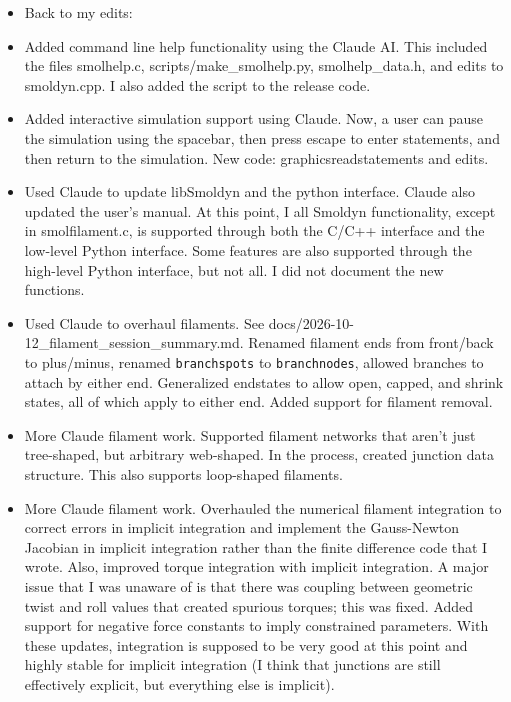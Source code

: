 \documentclass {scrbook}
\newcommand {\ttt} {\texttt}
\begin{document}
\begin{itemize}
\item Back to my edits:
\item Added command line help functionality using the Claude AI. This included the files smolhelp.c, scripts/make\_smolhelp.py, smolhelp\_data.h, and edits to smoldyn.cpp. I also added the script to the release code.
\item Added interactive simulation support using Claude. Now, a user can pause the simulation using the spacebar, then press escape to enter statements, and then return to the simulation. New code: graphicsreadstatements and edits.
\item Used Claude to update libSmoldyn and the python interface. Claude also updated the user's manual. At this point, I all Smoldyn functionality, except in smolfilament.c, is supported through both the C/C++ interface and the low-level Python interface. Some features are also supported through the high-level Python interface, but not all. I did not document the new functions.
\item Used Claude to overhaul filaments. See docs/2026-10-12\_filament\_session\_summary.md. Renamed filament ends from front/back to plus/minus, renamed \ttt{branchspots} to \ttt{branchnodes}, allowed branches to attach by either end. Generalized endstates to allow open, capped, and shrink states, all of which apply to either end. Added support for filament removal.
\item More Claude filament work. Supported filament networks that aren't just tree-shaped, but arbitrary web-shaped. In the process, created junction data structure. This also supports loop-shaped filaments.
\item More Claude filament work. Overhauled the numerical filament integration to correct errors in implicit integration and implement the Gauss-Newton Jacobian in implicit integration rather than the finite difference code that I wrote. Also, improved torque integration with implicit integration. A major issue that I was unaware of is that there was coupling between geometric twist and roll values that created spurious torques; this was fixed. Added support for negative force constants to imply constrained parameters. With these updates, integration is supposed to be very good at this point and highly stable for implicit integration (I think that junctions are still effectively explicit, but everything else is implicit).
\end{itemize}
\end{document}
